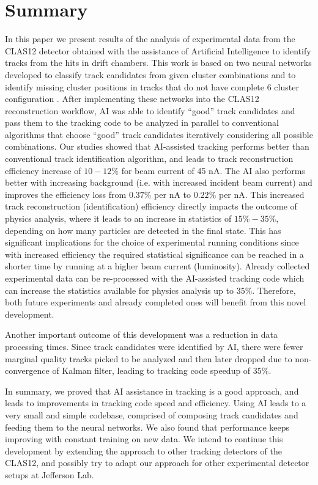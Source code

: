 \documentclass[aps,prl,preprint,12pt]{elsarticle}
\begin{document}
\section{Summary}

In this paper we present results of the analysis of experimental data from the CLAS12 detector obtained with the assistance of Artificial Intelligence
to identify tracks from the hits in drift chambers. This work is based on two neural networks developed to classify track candidates from
given cluster combinations \cite{Gavalian:2020oxg} and to identify missing cluster positions in tracks that do not have complete 6 cluster configuration \cite{Gavalian:2020xmc}. After implementing these networks into the CLAS12 reconstruction workflow, AI was able to identify ``good'' track candidates 
and pass them to the tracking code to be analyzed in parallel to conventional algorithms that choose ``good'' track candidates iteratively considering all possible combinations. 
Our studies showed that AI-assisted tracking performs better than conventional track identification algorithm, and leads to track reconstruction efficiency increase of $10-12\%$ for beam current of 45 nA. The AI also performs better with increasing background (i.e. with increased incident beam current) and improves the efficiency loss from $0.37\%$ per nA to $0.22\%$ per nA.
This increased track reconstruction (identification) efficiency directly impacts the outcome of physics analysis, where it leads to an increase in statistics of 
$15\%-35\%$, depending on how many particles are detected in the final state. This has significant implications for the choice of experimental running conditions since with increased efficiency the required statistical significance can be reached in a shorter time by running at a higher beam current (luminosity). Already collected experimental data can be re-processed with the AI-assisted tracking
code which can increase the statistics available for physics analysis up to $35\%$. Therefore, both future experiments and already completed ones will benefit 
from this novel development.

Another important outcome of this development was a reduction in data processing times. Since track candidates were identified by AI, there were fewer marginal quality tracks picked to be analyzed and then later dropped due to non-convergence of Kalman filter, leading to tracking code speedup of $35\%$.

In summary, we proved that AI assistance in tracking is a good approach, and leads to improvements in tracking code speed and efficiency. 
Using AI leads to a very small and simple codebase, comprised of composing track candidates and feeding them to the neural networks. 
We also found that performance keeps improving with constant training on new data. We intend to continue this development by extending 
the approach to other tracking detectors of the CLAS12, and possibly try to adapt our approach for other experimental detector setups at Jefferson Lab.
\end{document}
